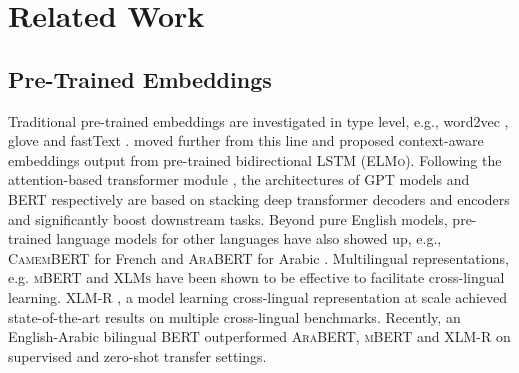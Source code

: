 \documentclass[11pt]{article}
\begin{document}
\section{Related Work}







\subsection{Pre-Trained Embeddings}
Traditional pre-trained embeddings are investigated in type level, e.g., word2vec \cite{mikolov2013efficient}, glove \citep{pennington2014glove} and fastText \citep{bojanowski-etal-2017-enriching}. \citet{peters-etal-2018-deep} moved further from this line and proposed context-aware embeddings output from pre-trained bidirectional LSTM (\textsc{ELMo}). Following the attention-based transformer module \citep{NIPS2017_3f5ee243}, the architectures of \textsc{GPT} models \citep{radford2018improving, radford2019language, NEURIPS2020_1457c0d6} and \textsc{BERT} \citep{devlin-etal-2019-bert} respectively are based on stacking deep transformer decoders and encoders and significantly boost downstream tasks. Beyond pure English models, pre-trained language models for other languages have also showed up, e.g., \textsc{CamemBERT} for French \citep{martin2020camembert} and  \textsc{AraBERT} for Arabic \citep{baly2020arabert}.
Multilingual representations, e.g. \textsc{mBERT} and \textsc{XLMs} \citep{NEURIPS2019_c04c19c2} have been shown to be effective to facilitate cross-lingual learning. \textsc{XLM-R} \citep{conneau2020unsupervised}, a model learning cross-lingual representation at scale achieved state-of-the-art results on multiple cross-lingual benchmarks. Recently, an English-Arabic bilingual BERT \citep{lan-etal-2020-empirical} outperformed \textsc{AraBERT}, \textsc{mBERT} and \textsc{XLM-R} on supervised and zero-shot transfer settings.
\end{document}
